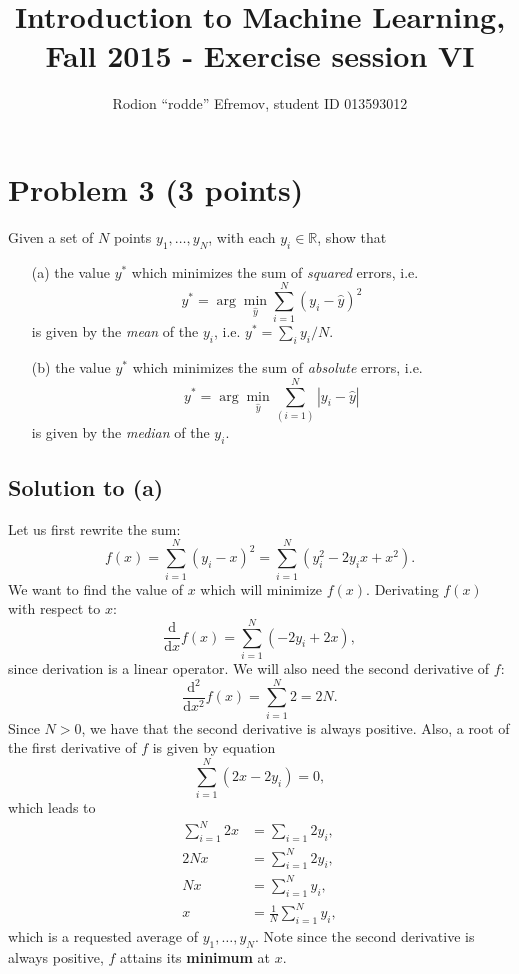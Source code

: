 \documentclass[10pt]{article}
\title{Introduction to Machine Learning, Fall 2015 - Exercise session VI}
\author{Rodion ``rodde'' Efremov, student ID 013593012}
\begin{document}
 \maketitle

\section*{Problem 3 (3 points)}
\color{blue}
Given a set of $N$ points $y_1, \dots, y_N$, with each $y_i \in \mathbb{R}$, show that
\begin{itemize}
\item[(a)] the value $y^{\ast}$ which minimizes the sum of \textit{squared} errors, i.e.
\[
y^{\ast} = \arg \min_{\hat{y}} \sum_{i = 1}^N (y_i - \hat{y})^2
\]
is given by the \textit{mean} of the $y_i$, i.e. $y^{\ast} = \sum_i y_i / N$.
\item[(b)] the value $y^{\ast}$ which minimizes the sum of \textit{absolute} errors, i.e.
\[
y^{\ast} = \arg \min_{\hat{y}} \sum_(i = 1)^N |y_i - \hat{y}|
\]
is given by the \textit{median} of the $y_i$.
\end{itemize}
\color{black}

\subsection*{Solution to (a)}
Let us first rewrite the sum:
\[
f(x) = \sum_{i = 1}^N (y_i - x)^2 = \sum_{i = 1}^N (y_i^2 - 2y_i x + x^2).
\]
We want to find the value of $x$ which will minimize $f(x)$. Derivating $f(x)$ with respect to $x$:
\[
\frac{\mathrm{d}}{\mathrm{d}x}f(x) = \sum_{i = 1}^N (-2y_i + 2x),
\]
since derivation is a linear operator. We will also need the second derivative of $f$:
\[
\frac{\mathrm{d}^2}{\mathrm{d}x^2}f(x) = \sum_{i = 1}^N 2 = 2N.
\]
Since $N > 0$, we have that the second derivative is always positive. Also, a root of the first derivative of $f$ is given by equation
\[
\sum_{i = 1}^N (2x - 2y_i) = 0,
\]
which leads to 
\begin{align*}
\sum_{i = 1}^N 2x &= \sum_{i = 1} 2y_i, \\
2Nx &= \sum_{i = 1}^N 2y_i, \\
Nx &= \sum_{i = 1}^N y_i, \\
x &= \frac{1}{N} \sum_{i = 1}^N y_i,
\end{align*}
which is a requested average of $y_1, \dots, y_N$. Note since the second derivative is always positive, $f$ attains its \textbf{minimum} at $x$.
\end{document}
